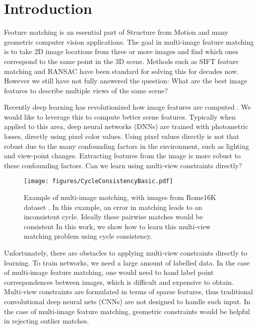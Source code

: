 \documentclass[10pt,twocolumn,letterpaper]{article}
\begin{document}
\section{Introduction}

Feature matching is an essential part of Structure from Motion and many geometric computer vision applications.
The goal in multi-image feature matching is to take 2D image locations from three or more images and find which ones correspond to the same point in the 3D scene.
Methods such as SIFT feature matching \cite{lowe2004distinctive} and RANSAC \cite{fischler1981random} have been standard for solving this for decades now.
However we still have not fully answered the question: What are the best image features to describe multiple views of the same scene?

Recently deep learning has revolutionized how image features are computed \cite{yi2016lift}. 
We would like to leverage this to compute better scene features.
Typically when applied to this area, deep neural networks (DNNs) are trained with photometric losses, directly using pixel color values.
Using pixel values directly is not that robust due to the many confounding factors in the environment, such as lighting and view-point changes.
Extracting features from the image is more robust to these confounding factors.
Can we learn using multi-view constraints directly?

\begin{figure}[t]
\begin{center}
  \texttt{[image: figures/CycleConsistencyBasic.pdf]}
\end{center}
  \caption{
    Example of multi-image matching, with images from Rome16K dataset \cite{li2010location}.
    In this example, an error in matching leads to an inconsistent cycle. 
    Ideally these pairwise matches would be consistent 
    In this work, we show how to learn this multi-view matching problem using cycle consistency.
  }
\label{fig:cycconsistex}
\label{fig:onecol}
\end{figure}

Unfortunately, there are obstacles to applying multi-view constraints directly to learning. 
To train networks, we need a large amount of labelled data.
In the case of multi-image feature matching, one would need to hand label point correspondences between images, which is difficult and expensive to obtain.
Multi-view constraints are formulated in terms of sparse features, thus traditional convolutional deep neural nets (CNNs) are not designed to handle such input.
In the case of multi-image feature matching, geometric constraints would be helpful in rejecting outlier matches.
\end{document}
